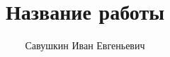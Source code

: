\newcommand{\resdir}{res}							%

\newcommand{\docauthor}{Савушкин Иван Евгеньевич}
\newcommand{\docauthorshort}{Савушкин\,И.\,Е.}
\newcommand{\docauthordept}{Группа P3311\\Кафедра Вычислительной Техники}
\newcommand{\docauthormail}{savushkin@niuitmo.ru}
\newcommand{\doctitle}{Название работы}
\newcommand{\docsupervisor}{Иванов\,И.\,И.}
\newcommand{\coursename}{Название предмета}
\newcommand{\worktype}{Тип работы}

\title{\doctitle}
\author{\docauthor}








{
	\SetBgContents{\gostframeformII}
	\BgMaterial
}

\NoBgThispage

\SetBgContents{\gostframeformIIa}

\tableofcontents
\restoregeometry
\newpage


